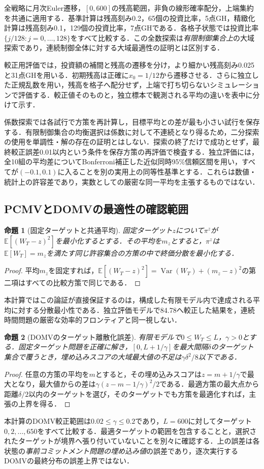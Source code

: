 \documentclass[10pt,a4paper]{article}
\numberwithin{equation}{section}
\numberwithin{table}{section}
\numberwithin{figure}{section}
\theoremstyle{plain}
\newtheorem{proposition}{命題}
\theoremstyle{definition}
\newcommand{\E}{\mathbb{E}}
\DeclareMathOperator{\Var}{Var}
\begin{document}
全戦略に月次Euler遷移，$[0,600]$の残高範囲，非負の線形確率配分，上端集約を共通に適用する．基準計算は残高刻み0.2，65個の投資比率，5点GH，精緻化計算は残高刻み0.1，129個の投資比率，7点GHである．各格子状態では投資比率$\{j/128:j=0,\ldots,128\}$をすべて比較する．この全数探索は\emph{有限制御集合上}の大域探索であり，連続制御全体に対する大域最適性の証明とは区別する．

較正用評価では，投資額の補間と残高の遷移を分け，より細かい残高刻み0.025と31点GHを用いる．初期残高は正確に$x_0=1/12$から遷移させる．さらに独立した正規乱数を用い，残高を格子へ配分せず，上端で打ち切らないシミュレーションで評価する．較正値そのものと，独立標本で観測される平均の違いを表中に分けて示す．

係数探索では各試行で方策を再計算し，目標平均との差が最も小さい試行を保存する．有限制御集合の均衡選択は係数に対して不連続となり得るため，二分探索の使用を単調性・解の存在の証明とはしない．探索の終了だけで成功とせず，最終較正誤差0.01以内という条件を保存方策の再評価で検査する．独立評価には，全10組の平均差についてBonferroni補正した近似同時95\%信頼区間を用い，すべてが$(-0.1,0.1)$に入ることを別の実用上の同等性基準とする．これらは数値・統計上の許容差であり，実数としての厳密な同一平均を主張するものではない．

\subsection{PCMVとDOMVの最適性の確認範囲}
\begin{proposition}[固定ターゲットと共通平均]
固定ターゲット$z$について$\pi^z$が$\E[(W_T-z)^2]$を最小化するとする．その平均を$m_z$とすると，$\pi^z$は$\E[W_T]=m_z$を満たす同じ許容集合の方策の中で終価分散を最小化する．
\end{proposition}
\begin{proof}
平均$m_z$を固定すれば，$\E[(W_T-z)^2]=\Var(W_T)+(m_z-z)^2$の第二項はすべての比較方策で同じである．
\end{proof}
本計算ではこの論証が直接保証するのは，構成した有限モデル内で達成される平均に対する分散最小性である．独立評価モデルで84.78へ較正した結果を，連続時間問題の厳密な効率的フロンティアと同一視しない．

\begin{proposition}[DOMVのターゲット離散化誤差]
有限モデルで$0\leq W_T\leq L$，$\gamma>0$とする．固定ターゲット問題を正確に解き，$[0,L+1/\gamma]$を最大間隔$\delta$のターゲット集合で覆うとき，埋め込みスコアの大域最大値の不足は$\gamma\delta^2/8$以下である．
\end{proposition}
\begin{proof}
任意の方策の平均を$m$とすると，その埋め込みスコアは$z=m+1/\gamma$で最大となり，最大値からの差は$\gamma(z-m-1/\gamma)^2/2$である．最適方策の最大点から距離$\delta/2$以内のターゲットを選び，そのターゲットでも方策を最適化すれば，主張の上界を得る．
\end{proof}
本計算のDOMV較正範囲は$0.02\leq\gamma\leq0.2$であり，$L=600$に対してターゲット$0,2,\ldots,650$をすべて比較する．最適ターゲットの範囲を包含することと，選択されたターゲットが境界へ張り付いていないことを別々に確認する．上の誤差は各状態の\emph{事前コミットメント問題の埋め込み値}の誤差であり，逐次実行するDOMVの最終分布の誤差上界ではない．
\end{document}

